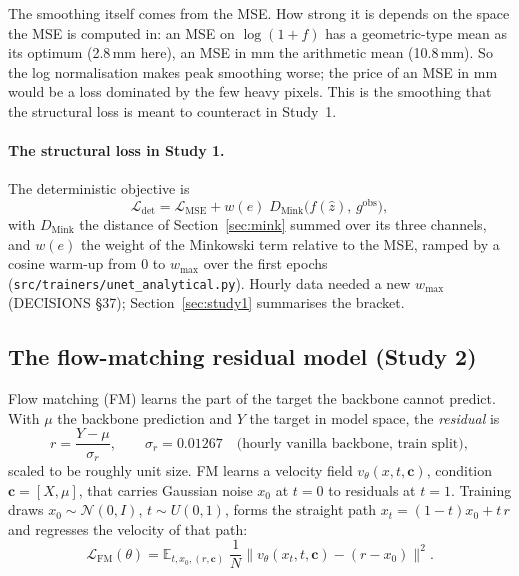 \documentclass[11pt,a4paper]{article}
\newcommand{\E}{\mathbb{E}}
\begin{document}
\noindent The smoothing itself comes from the MSE. How strong it is depends on the space the MSE is computed in: an MSE
on $\log(1+f)$ has a geometric-type mean as its optimum (2.8\,mm here), an MSE in mm the arithmetic mean (10.8\,mm). So
the log normalisation makes peak smoothing worse; the price of an MSE in mm would be a loss dominated by the few heavy
pixels. This is the smoothing that the structural loss is meant to counteract in Study~1.

\paragraph{The structural loss in Study 1.} The deterministic objective is
\begin{equation}\label{eq:det}
  \mathcal L_{\mathrm{det}} = \mathcal L_{\mathrm{MSE}} + w(e)\; D_{\mathrm{Mink}}\big(f(\hat z),\, g^{\mathrm{obs}}\big),
\end{equation}
with $D_{\mathrm{Mink}}$ the distance of Section~\ref{sec:mink} summed over its three channels, and $w(e)$ the weight
of the Minkowski term relative to the MSE, ramped by a cosine warm-up from 0 to $w_{\max}$ over the first epochs (\texttt{src/trainers/unet\_analytical.py}). Hourly data needed a new
$w_{\max}$ (DECISIONS \S37); Section~\ref{sec:study1} summarises the bracket.

\subsection{The flow-matching residual model (Study 2)}
Flow matching (FM) learns the part of the target the backbone cannot predict. With $\mu$ the backbone prediction and
$Y$ the target in model space, the \emph{residual} is
\begin{equation}
  r = \frac{Y-\mu}{\sigma_r},\qquad \sigma_r = 0.01267 \quad\text{(hourly vanilla backbone, train split)},
\end{equation}
scaled to be roughly unit size. FM learns a velocity field $v_\theta(x,t,\mathbf c)$, condition $\mathbf c = [X,\mu]$,
that carries Gaussian noise $x_0$ at $t=0$ to residuals at $t=1$. Training draws $x_0\sim\mathcal N(0,I)$,
$t\sim U(0,1)$, forms the straight path $x_t = (1-t)x_0 + t\,r$ and regresses the velocity of that path:
\begin{equation}\label{eq:fm}
  \mathcal L_{\mathrm{FM}}(\theta) = \E_{t,x_0,(r,\mathbf c)}\;\frac1N\big\| v_\theta(x_t,t,\mathbf c) - (r - x_0)\big\|^2 .
\end{equation}
\end{document}
